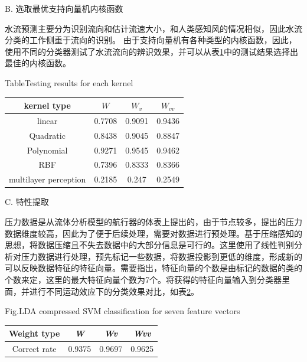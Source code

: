 B. {选取最优支持向量机内核函数}

水流预测主要分为识别流向和估计流速大小，和人类感知风的情况相似，因此水流分类的工作侧重于流向的识别。 由于支持向量机有各种类型的内核函数，因此，使用不同的分类器测试了水流流向的辨识效果，并可以从表\ref{table:chap3:kenerls}中的测试结果选择出最佳的内核函数。

\begin{table}[!htp]
  \centering
  \label{table:chap3:kenerls}%
   {Table}{Testing results for each kernel }
    \begin{tabular}{cccc}
    \toprule
    kernel type & $W$ & $W_v$    & $W_{vv}$ \\
    \midrule
    linear & 0.7708 & 0.9091 & 0.9436 \\
    Quadratic & 0.8438 & 0.9045 & 0.8847 \\
    Polynomial & 0.9271 & 0.9545 & 0.9462 \\
    RBF   & 0.7396 & 0.8333 & 0.8366 \\
    multilayer perception & 0.2185 & 0.247 & 0.2549 \\
    \bottomrule
    \end{tabular}%
\end{table}%

C. {特性提取 }

压力数据是从流体分析模型的航行器的体表上提出的，由于节点较多，提出的压力数据维度较高，因此为了便于后续处理，需要对数据进行预处理。基于压缩感知的思想，将数据压缩且不失去数据中的大部分信息是可行的。这里使用了线性判别分析对压力数据进行处理，预先标记一些数据，将数据投影到更低的维度，形成新的可以反映数据特征的特征向量。需要指出，特征向量的个数是由标记的数据的类的个数来定，这里的最大特征向量个数为7个。将获得的特征向量输入到分类器里面，并进行不同运动效应下的分类效果对比，如表\ref{table:chap3:sevenvector}。

\begin{table}[!htp]
  \centering
  \label{table:chap3:sevenvector}%
   {Fig.}{LDA compressed SVM classification for seven feature vectors }
    \begin{tabular*}{7cm}{cccc}
    \toprule
    Weight type & \textit{W} & \textit{Wv} & \textit{Wvv} \\
    \midrule
    Correct rate & 0.9375 & 0.9697 & 0.9625 \\
    \bottomrule
    \end{tabular*}%
\end{table}%

